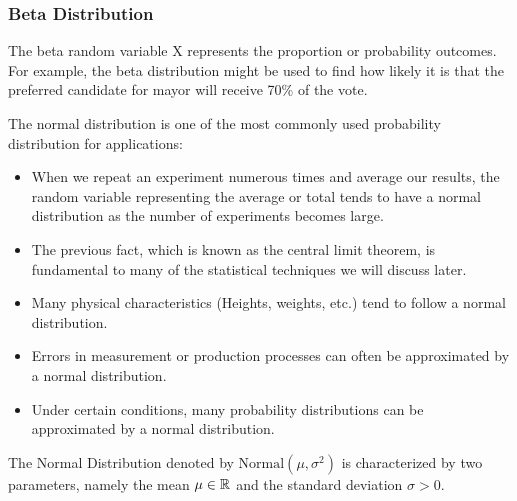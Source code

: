 \documentclass[compress]{beamer}
\begin{document}

\begin{frame}\frametitle{Beta Distribution}
The beta random variable X represents the proportion or probability
outcomes. For example, the beta distribution might be used to find
how likely it is that the preferred candidate for mayor will receive 70\% of the vote.

\end{frame}





\begin{frame}
The normal distribution is one of the most commonly used probability distribution for applications:
\begin{itemize}
\item  When we repeat an experiment numerous times and average our results, the random variable representing the average or total tends to have a normal distribution as the number of experiments becomes large.
\item   The previous fact, which is known as the central limit theorem, is fundamental to many of the statistical techniques we will discuss later.
\item  Many physical characteristics (Heights, weights, etc.) tend to follow a normal distribution.
\item  Errors in measurement or production processes can often be
approximated by a normal distribution.
\item Under certain conditions, many probability distributions can be
approximated by a normal distribution.
\end{itemize}
\end{frame}



\begin{frame}
The Normal Distribution denoted by $\text{Normal}(\mu, \sigma^2)$ is characterized by two parameters, namely the mean $\mu\in \mathbb{R}$ and the standard deviation $\sigma>0$.


\end{frame}
\end{document}
